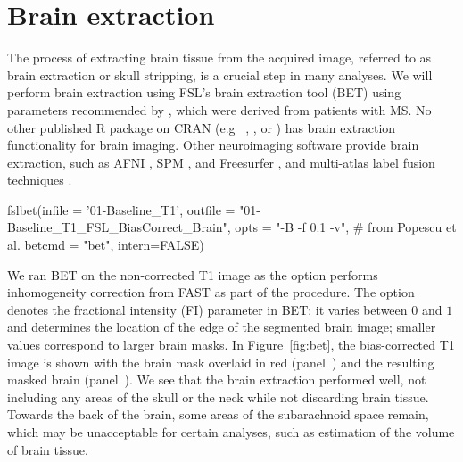 \section{Brain extraction}
The process of extracting brain tissue from the acquired image, referred to as brain extraction or skull stripping, is a crucial step in many analyses.  We will perform brain extraction using FSL's brain extraction tool (BET) \citep{smith_fast_2002, jenkinson_bet2:_2005} using parameters recommended by \citet{popescu_optimizing_2012}, which were derived from patients with MS.  No other published R package on CRAN (e.g~ , , or ) has brain extraction functionality for brain imaging.  Other neuroimaging software provide brain extraction, such as AFNI \citep{cox_afni:_1996}, SPM \citep{ashburner_unified_2005}, and Freesurfer \citep{fischl_freesurfer_2012}, and multi-atlas label fusion techniques \citep{doshi_multi-atlas_2013}.
 


\begin{Schunk}
\begin{Sinput}
fslbet(infile =  '01-Baseline_T1', 
       outfile = "01-Baseline_T1_FSL_BiasCorrect_Brain", 
       opts = "-B -f 0.1 -v",  # from Popescu et al.
       betcmd = "bet", 
       intern=FALSE)
\end{Sinput}
\end{Schunk}


We ran BET on the non-corrected T1 image as the  option performs inhomogeneity correction from FAST as part of the procedure.  The option  denotes the fractional intensity (FI) parameter in BET: it varies between $0$ and $1$ and determines the location of the edge of the segmented brain image; smaller values correspond to larger brain masks. In Figure~\ref{fig:bet}, the bias-corrected T1 image is shown with the brain mask overlaid in red (panel~\protect{}) and the resulting masked brain (panel~\protect{}).  We see that the brain extraction performed well, not including any areas of the skull or the neck while not discarding brain tissue.  Towards the back of the brain, some areas of the subarachnoid space remain, which may be unacceptable for certain analyses, such as estimation of the volume of brain tissue.



